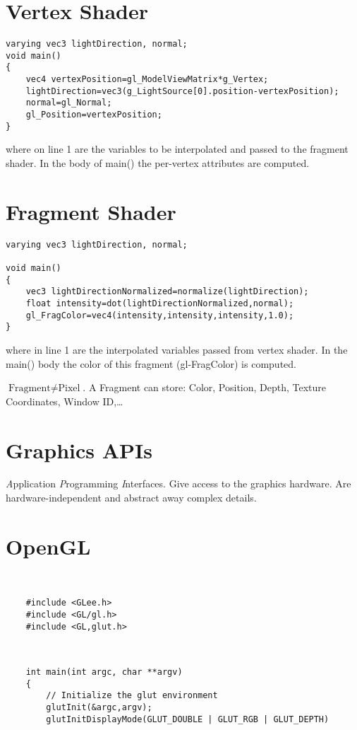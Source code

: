 \begin{compactdesc}
\section{Vertex Shader}
\begin{lstlisting}
varying vec3 lightDirection, normal;
void main()
{
	vec4 vertexPosition=gl_ModelViewMatrix*g_Vertex;
	lightDirection=vec3(g_LightSource[0].position-vertexPosition);
	normal=gl_Normal;
	gl_Position=vertexPosition;
}
\end{lstlisting}
where on line 1 are the variables to be interpolated and passed to the fragment shader. In the body of main() the per-vertex attributes are computed.
\section{Fragment Shader}
\begin{lstlisting}
varying vec3 lightDirection, normal;

void main()
{
	vec3 lightDirectionNormalized=normalize(lightDirection);
	float intensity=dot(lightDirectionNormalized,normal);
	gl_FragColor=vec4(intensity,intensity,intensity,1.0);
}
\end{lstlisting}
where in line 1 are the interpolated variables passed from vertex shader. In the main() body the color of this fragment (gl-FragColor) is computed.
\item[\lp{Fragment}] $\text{Fragment}\neq\text{Pixel}$. A Fragment can store: Color, Position, Depth, Texture Coordinates, Window ID,\ldots\\
	\section{Graphics APIs}
	\emph{A}pplication \emph{P}rogramming \emph{I}nterfaces. Give access to the graphics hardware. Are hardware-independent and abstract away complex details.
	\section{OpenGL}
\item[\lp{includes}]\hfill\\
	\begin{lstlisting}
	#include <GLee.h>
	#include <GL/gl.h>
	#include <GL,glut.h>
	\end{lstlisting}
\item[\lp{main application}]\hfill\\
	\begin{lstlisting}
	int main(int argc, char **argv)
	{
		// Initialize the glut environment
		glutInit(&argc,argv);
		glutInitDisplayMode(GLUT_DOUBLE | GLUT_RGB | GLUT_DEPTH)


\end{lstlisting}
\end{compactdesc}
